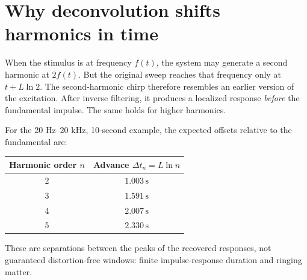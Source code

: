 \documentclass[11pt,a4paper]{article}
\begin{document}
\section{Why deconvolution shifts harmonics in time}
When the stimulus is at frequency $f(t)$, the system may generate a second harmonic at $2f(t)$. But the original sweep reaches that frequency only at $t+L\ln2$. The second-harmonic chirp therefore resembles an earlier version of the excitation. After inverse filtering, it produces a localized response \emph{before} the fundamental impulse. The same holds for higher harmonics.

For the 20 Hz--20 kHz, 10-second example, the expected offsets relative to the fundamental are:
\begin{center}\begin{tabular}{cc}\toprule Harmonic order $n$ & Advance $\Delta t_n=L\ln n$ \\ \midrule
2 & $1.003\,\mathrm{s}$\\3 & $1.591\,\mathrm{s}$\\4 & $2.007\,\mathrm{s}$\\5 & $2.330\,\mathrm{s}$\\\bottomrule\end{tabular}\end{center}
These are separations between the peaks of the recovered responses, not guaranteed distortion-free windows: finite impulse-response duration and ringing matter.
\end{document}
